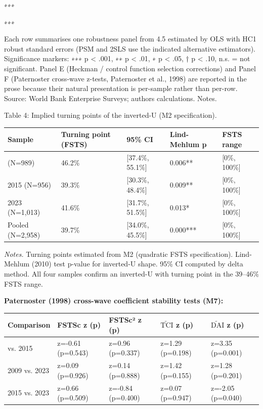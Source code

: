 \documentclass[12pt,a4paper]{article}
\begin{document}
∗∗∗

∗∗∗

Each row summarises one robustness panel from 4.5 estimated by OLS with
HC1 robust standard errors (PSM and 2SLS use the indicated alternative
estimators). Significance markers: ∗∗∗ p \textless{} .001, ∗∗ p
\textless{} .01, ∗ p \textless{} .05, † p \textless{} .10, n.s. = not
significant. Panel E (Heckman / control function selection corrections)
and Panel F (Paternoster cross-wave z-tests, Paternoster et al., 1998)
are reported in the prose because their natural presentation is
per-sample rather than per-row. Source: World Bank Enterprise Surveys;
authors\textquotesingle{} calculations. Notes.

Table 4: Implied turning points of the inverted-U (M2 specification).

\begin{longtable}[]{@{}lllll@{}}
\toprule\noalign{}
Sample & Turning point (FSTS) & 95\% CI & Lind-Mehlum p & FSTS range \\
\midrule\noalign{}
\endhead
\bottomrule\noalign{}
\endlastfoot
2009 (N=989) & 46.2\% & {[}37.4\%, 55.1\%{]} & 0.006** & {[}0\%,
100\%{]} \\
2015 (N=956) & 39.3\% & {[}30.3\%, 48.4\%{]} & 0.009** & {[}0\%,
100\%{]} \\
2023 (N=1,013) & 41.6\% & {[}31.7\%, 51.5\%{]} & 0.013* & {[}0\%,
100\%{]} \\
Pooled (N=2,958) & 39.7\% & {[}34.0\%, 45.5\%{]} & 0.000*** & {[}0\%,
100\%{]} \\
\end{longtable}

\emph{Notes.} Turning points estimated from M2 (quadratic FSTS
specification). Lind-Mehlum (2010) test p-value for inverted-U shape.
95\% CI computed by delta method. All four samples confirm an inverted-U
with turning point in the 39--46\% FSTS range.

\textbf{Paternoster (1998) cross-wave coefficient stability tests (M7):}

\begin{longtable}[]{@{}lllll@{}}
\toprule\noalign{}
Comparison & FSTSc z (p) & FSTSc² z (p) & \(\tilde{\mathrm{TCI}}\) z (p)
& \(\tilde{\mathrm{DAI}}\) z (p) \\
\midrule\noalign{}
\endhead
\bottomrule\noalign{}
\endlastfoot
2009 vs. 2015 & z=-0.61 (p=0.543) & z=0.96 (p=0.337) & z=1.29 (p=0.198)
& z=3.35 (p=0.001) \\
2009 vs. 2023 & z=0.09 (p=0.926) & z=0.14 (p=0.888) & z=1.42 (p=0.155) &
z=1.28 (p=0.201) \\
2015 vs. 2023 & z=0.66 (p=0.509) & z=-0.84 (p=0.400) & z=0.07 (p=0.947)
& z=-2.05 (p=0.040) \\
\end{longtable}
\end{document}

